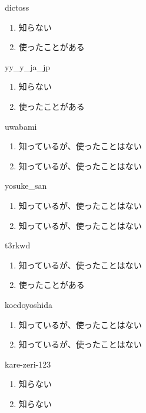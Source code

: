 \begin{prework}{ dictoss }
  \begin{enumerate}
  \item 知らない
  \item 使ったことがある
  \end{enumerate}
\end{prework}

\begin{prework}{ yy\_y\_ja\_jp }
  \begin{enumerate}
  \item 知らない
  \item 使ったことがある
  \end{enumerate}
\end{prework}

\begin{prework}{ uwabami }
  \begin{enumerate}
  \item 知っているが、使ったことはない
  \item 知っているが、使ったことはない
  \end{enumerate}
\end{prework}

\begin{prework}{ yosuke\_san }
  \begin{enumerate}
  \item 知っているが、使ったことはない
  \item 知っているが、使ったことはない
  \end{enumerate}
\end{prework}

\begin{prework}{ t3rkwd }
  \begin{enumerate}
  \item 知っているが、使ったことはない
  \item 使ったことがある 
  \end{enumerate}
\end{prework}

\begin{prework}{ koedoyoshida }
  \begin{enumerate}
  \item 知っているが、使ったことはない
  \item 知っているが、使ったことはない
  \end{enumerate}
\end{prework}

\begin{prework}{ kare-zeri-123 }
  \begin{enumerate}
  \item 知らない
  \item 知らない
  \end{enumerate}
\end{prework}

